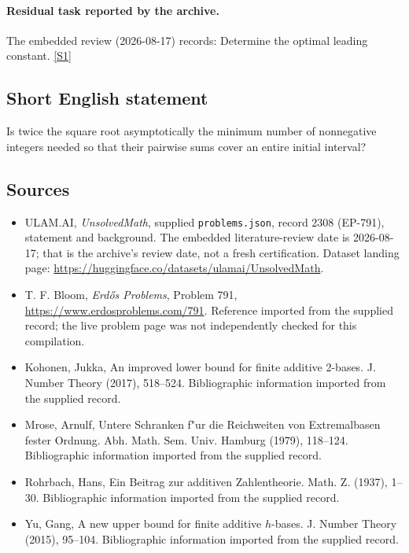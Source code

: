 \documentclass[11pt,a4paper]{article}
\newcommand{\sref}[2]{\hyperlink{source:#1:#2}{[S#2]}}
\begin{document}
\paragraph{Residual task reported by the archive.}

The embedded review (2026-08-17) records: Determine the optimal leading constant. \sref{2308}{1}

\subsection{Short English statement}

Is twice the square root asymptotically the minimum number of nonnegative integers needed so that their pairwise sums cover an entire initial interval?

\subsection{Sources}

{\small

\begin{itemize}

\item[\hypertarget{source:2308:1}{S1}] ULAM.AI, \emph{UnsolvedMath}, supplied \texttt{problems.json}, record 2308 (EP-791), statement and background. The embedded literature-review date is 2026-08-17; that is the archive’s review date, not a fresh certification. Dataset landing page: \url{https://huggingface.co/datasets/ulamai/UnsolvedMath}.

\item[\hypertarget{source:2308:2}{S2}] T. F. Bloom, \emph{Erdős Problems}, Problem 791, \url{https://www.erdosproblems.com/791}. Reference imported from the supplied record; the live problem page was not independently checked for this compilation.

\item[\hypertarget{source:2308:3}{S3}] Kohonen, Jukka, An improved lower bound for finite additive 2-bases. J. Number Theory (2017), 518--524. Bibliographic information imported from the supplied record.

\item[\hypertarget{source:2308:4}{S4}] Mrose, Arnulf, Untere {S}chranken f"ur die {R}eichweiten von {E}xtremalbasen fester {O}rdnung. Abh. Math. Sem. Univ. Hamburg (1979), 118--124. Bibliographic information imported from the supplied record.

\item[\hypertarget{source:2308:5}{S5}] Rohrbach, Hans, Ein {B}eitrag zur additiven {Z}ahlentheorie. Math. Z. (1937), 1--30. Bibliographic information imported from the supplied record.

\item[\hypertarget{source:2308:6}{S6}] Yu, Gang, A new upper bound for finite additive {$h$}-bases. J. Number Theory (2015), 95--104. Bibliographic information imported from the supplied record.

\end{itemize}

}

\label{end:2308}
\end{document}
